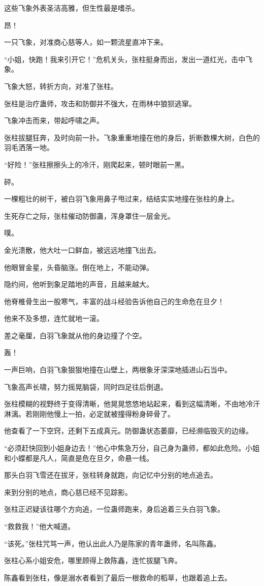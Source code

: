\begin{this_body}
这些飞象外表圣洁高雅，但生性最是嗜杀。

昂！

一只飞象，对准商心慈等人，如一颗流星直冲下来。

“小姐，快跑！我来引开它！”危机关头，张柱挺身而出，发出一道红光，击中飞象。

飞象大怒，转折方向，对准了张柱。

张柱是治疗蛊师，攻击和防御并不强大，在雨林中狼狈逃窜。

飞象冲击而来，带起呼啸之声。

张柱拔腿狂奔，及时向前一扑。飞象重重地撞在他的身后，折断数棵大树，白色的羽毛洒落一地。

“好险！”张柱擦擦头上的冷汗，刚爬起来，顿时眼前一黑。

砰。

一棵粗壮的树干，被白羽飞象用鼻子甩过来，结结实实地撞在张柱的身上。

生死存亡之际，张柱催动防御蛊，浑身罩住一层金光。

噗。

金光溃散，他大吐一口鲜血，被远远地撞飞出去。

他眼冒金星，头昏脑涨。倒在地上，不能动弹。

隐约间，他听到象足踏地的声音，且越来越大。

他脊椎骨生出一股寒气，丰富的战斗经验告诉他自己的生命危在旦夕！

他来不及多想，连忙就地一滚。

差之毫厘，白羽飞象就从他的身边撞了个空。

轰！

一声巨响，白羽飞象狠狠地撞在山壁上，两根象牙深深地插进山石当中。

飞象高声长啸，努力摇晃脑袋，同时四足往后倒退。

张柱模糊的视野终于变得清晰，他晃晃悠悠地站起来，看到这幅清晰，不由地冷汗淋漓。若刚刚他慢上一拍，必定就被撞得粉身碎骨了。

他查看了一下空窍，还剩下五成真元。防御蛊状态萎靡，已经濒临毁灭的边缘。

“必须赶快回到小姐身边去！”他心中焦急万分，自己身为蛊师，都如此危险。小姐和小蝶都是凡人，简直是危在旦夕，命悬一线。

那头白羽飞雪还在拔牙，张柱转身就跑，向记忆中分别的地点追去。

来到分别的地点，商心慈已经不见踪影。

张柱正迟疑该往哪个方向追，一位蛊师跑来，身后追着三头白羽飞象。

“救救我！”他大喊道。

“该死。”张柱咒骂一声，他认出此人乃是陈家的青年蛊师，名叫陈鑫。

张柱心系小姐安危，哪里顾得上救陈鑫，连忙拔腿飞奔。

陈鑫看到张柱，像是溺水者看到了最后一根救命的稻草，也跟着追上去。

\end{this_body}

